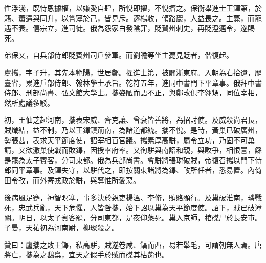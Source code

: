 \begin{pinyinscope}
 性浮淺，既恃恩據權，以嫌愛自肆，所悅即擢，不悅擠之。保衡舉進士王鐸第，於籍、蕭遘與同升，以嘗薄於己，皆見斥。逐楊收，傾路巖，人益畏之。主薨，而寵遇不衰。僖宗立，進司徒。俄為怨家白發陰罪，貶賀州刺史，再貶澄邁令，遂賜死。



 弟保乂，自兵部侍郎貶賓州司戶參軍。而劉瞻等坐主薨見貶者，偕復起。



 盧攜，字子升，其先本範陽，世居鄭。擢進士第，被闢浙東府。入朝為右拾遺，歷臺省，累進戶部侍郎、翰林學士承旨。乾符五年，進同中書門下平章事。俄拜中書侍郎、刑部尚書、弘文館大學士。攜姿陋而語不正，與鄭畋俱李翱甥，同位宰相，然所處議多駁。



 初，王仙芝起河南，攜表宋威、齊克讓、曾袞皆善將，為招討使。及威殺尚君長，賊熾結，益不制，乃以王鐸鎮荊南，為諸道都統。攜不悅。是時，黃巢已破廣州，勢張甚，表求天平節度使，詔宰相百官議。攜素厚高駢，屬令立功，乃固不可巢請，又欲激巢使戰而敗鐸，因授率府率。又徇駢與南詔和親，與畋爭，相恨詈，繇是罷為太子賓客，分司東都。俄為兵部尚書。會駢將張璘破賊，帝復召攜以門下侍郎同平章事。及鐸失守，以駢代之，即按關東諸將為鐸、畋所任者，悉易置。內倚田令孜，而外寄戎政於駢，與奪惟所愛惡。



 後病風足蹇，神智瞑塞，事多決於親吏楊溫、李脩，賄賂顯行。及巢破淮南，璘戰死，忠武兵亂，天下危懼，人皆咎攜，始下詔以巢為天平節度使。詔下，賊已破潼關。明日，以太子賓客罷，分司東都，是夜仰藥死。巢入京師，棺磔尸於長安市。子晏，天祐初為河南尉，柳璨殺之。



 贊曰：盧攜之敗王鐸，私高駢，賊遂卷咸、鎬而西，易若舉毛，可謂朝無人焉。唐將亡，攜為之鴟梟，宜天之假手於賊而磔其枯胔也。



\end{pinyinscope}